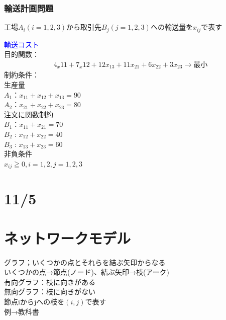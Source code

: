\documentclass{jsarticle}
\begin{document}
{			\subsubsection{輸送計画問題}
				工場$A_i(i=1,2,3)$から取引先$B_j(j=1,2,3)$への輸送量を$x_{ij}$で表す\\
				{\textcolor{blue}{輸送コスト}\\
				目的関数：\\
				\begin{eqnarray}
					4_x{11}+7_x{12}+12x_{13}+11x_{21}+6x_{22}+3x_{23}→最小
				\end{eqnarray}
				制約条件：\\
					生産量\\
					$A_1$：$x_{11}+x_{12}+x_{13}=90$\\
					$A_2$：$x_{21}+x_{22}+x_{23}=80$\\
					注文に関数制約\\
					$B_1$：$x_{11}+x_{21}=70$\\
					$B_2$ : $x_{12}+x_{22}=40$\\
					$B_3$ : $x_{13}+x_{23}=60$\\
					非負条件\\
					$x_{ij}≧0 , i=1,2 , j=1,2,3$\\
					
\section{11/5}
\section{ネットワークモデル}
	グラフ；いくつかの点とそれらを結ぶ矢印からなる\\
	いくつかの点→節点(ノード)、結ぶ矢印→枝(アーク)\\
	有向グラフ：枝に向きがある\\
	無向グラフ：枝に向きがない\\
	節点iからjへの枝を$(i,j)$で表す\\
	例→教科書\\

}}
\end{document}
